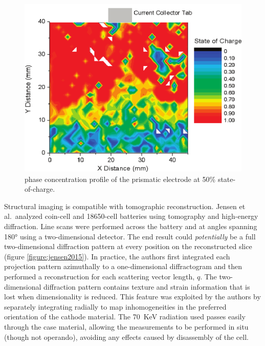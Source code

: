 \documentclass[journal=cmatex,manuscript=perspective]{achemso}
\begin{document}
\begin{figure}
  \includegraphics[width=\textwidth]{liu2010.png}
  \caption{ phase concentration profile of the prismatic
    electrode at 50\% state-of-charge.\cite{liu2010}}
  \label{figure:liu2010}
\end{figure}

Structural imaging is compatible with tomographic reconstruction.
Jensen et al.\ analyzed coin-cell and 18650-cell batteries using
tomography and high-energy diffraction\cite{jensen2015}. Line scans
were performed across the battery and at angles spanning \ang{180}
using a two-dimensional detector. The end result could
\emph{potentially} be a full two-dimensional diffraction pattern at
every position on the reconstructed slice (figure
\ref{figure:jensen2015}). In practice, the authors first integrated
each projection pattern azimuthally to a one-dimensional diffractogram
and then performed a reconstruction for each scattering vector length,
$q$. The two-dimensional diffraction pattern contains texture and
strain information that is lost when dimensionality is
reduced\cite{bobhe}. This feature was exploited by the authors by
separately integrating radially to map inhomogeneities in the
preferred orientation of the  cathode material. The
\SI{70}{KeV} radiation used passes easily through the case material,
allowing the measurements to be performed in situ (though not
operando), avoiding any effects caused by disassembly of the cell.
\end{document}
